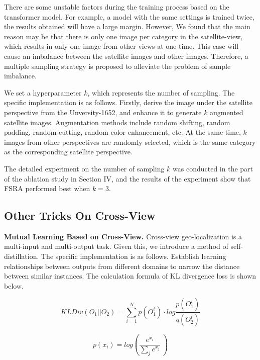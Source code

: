 \documentclass[lettersize,journal]{IEEEtran}
\begin{document}
There are some unstable factors during the training process based on the transformer model.  For example, a model with the same settings is trained twice, the results obtained will have a large margin. However, We found that the main reason may be that there is only one image per category in the satellite-view, which results in only one image from other views at one time. This case will cause an imbalance between the satellite images and other images. Therefore, a multiple sampling strategy is proposed to alleviate the problem of sample imbalance.

We set a hyperparameter $k$, which represents the number of sampling. The specific implementation is as follows. Firstly, derive the image under the satellite perspective from the Unversity-1652, and enhance it to generate $k$ augmented satellite images. Augmentation methods include random shifting, random padding, random cutting, random color enhancement, etc. At the same time, $k$ images from other perspectives are randomly selected, which is the same category as the corresponding satellite perspective. 

The detailed experiment on the number of sampling $k$
was conducted in the part of the ablation study in Section IV, and the results of the experiment show that FSRA performed best when $k=3$. 




\subsection{Other Tricks On Cross-View}

\textbf{Mutual Learning Based on Cross-View.} Cross-view geo-localization is a multi-input and multi-output task. Given this, we introduce a method of self-distillation. The specific implementation is as follows. Establish learning relationships between outputs from different domains to narrow the distance between similar instances. The calculation formula of KL divergence loss is shown below. 



\begin{equation}
\label{eq6}
KLDiv(O_1\vert{}\vert{}O_2)=\sum_{i=1}^Np(O_1^i)\cdot{}log\frac{p(O_1^i)}{q(O_2^i)}
\end{equation}


\begin{equation}
\label{eq7}
 p(x_i)=log(\frac{e^{x_i}}{\sum_je^{x_j}}\ )
\end{equation}
\end{document}
